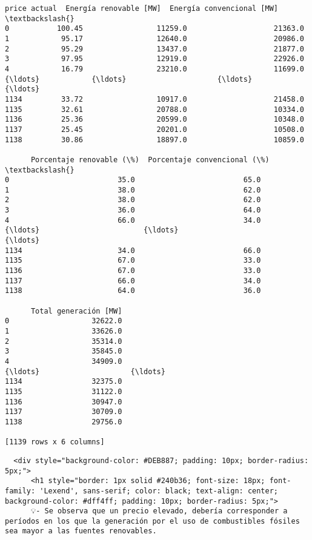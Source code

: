 \documentclass[11pt]{article}
\makeatletter
\newcommand{\boxspacing}{\kern\kvtcb@left@rule\kern\kvtcb@boxsep}
\newcommand{\prompt}[4]{
        {\ttfamily\llap{{\color{#2}[#3]:\hspace{3pt}#4}}\vspace{-\baselineskip}}
    }
\makeatother
\begin{document}
            \begin{tcolorbox}[breakable, size=fbox, boxrule=.5pt, pad at break*=1mm, opacityfill=0]
\prompt{Out}{outcolor}{100}{\boxspacing}
\begin{Verbatim}[commandchars=\\\{\}]
      price actual  Energía renovable [MW]  Energía convencional [MW]  \textbackslash{}
0           100.45                 11259.0                    21363.0
1            95.17                 12640.0                    20986.0
2            95.29                 13437.0                    21877.0
3            97.95                 12919.0                    22926.0
4            16.79                 23210.0                    11699.0
{\ldots}            {\ldots}                     {\ldots}                        {\ldots}
1134         33.72                 10917.0                    21458.0
1135         32.61                 20788.0                    10334.0
1136         25.36                 20599.0                    10348.0
1137         25.45                 20201.0                    10508.0
1138         30.86                 18897.0                    10859.0

      Porcentaje renovable (\%)  Porcentaje convencional (\%)  \textbackslash{}
0                         35.0                         65.0
1                         38.0                         62.0
2                         38.0                         62.0
3                         36.0                         64.0
4                         66.0                         34.0
{\ldots}                        {\ldots}                          {\ldots}
1134                      34.0                         66.0
1135                      67.0                         33.0
1136                      67.0                         33.0
1137                      66.0                         34.0
1138                      64.0                         36.0

      Total generación [MW]
0                   32622.0
1                   33626.0
2                   35314.0
3                   35845.0
4                   34909.0
{\ldots}                     {\ldots}
1134                32375.0
1135                31122.0
1136                30947.0
1137                30709.0
1138                29756.0

[1139 rows x 6 columns]
\end{Verbatim}
\end{tcolorbox}
        
    \begin{verbatim}
  <div style="background-color: #DEB887; padding: 10px; border-radius: 5px;">
      <h1 style="border: 1px solid #240b36; font-size: 18px; font-family: 'Lexend', sans-serif; color: black; text-align: center; background-color: #dff4ff; padding: 10px; border-radius: 5px;">
      💡- Se observa que un precio elevado, debería corresponder a períodos en los que la generación por el uso de combustibles fósiles sea mayor a las fuentes renovables.
\end{verbatim}
\end{document}
